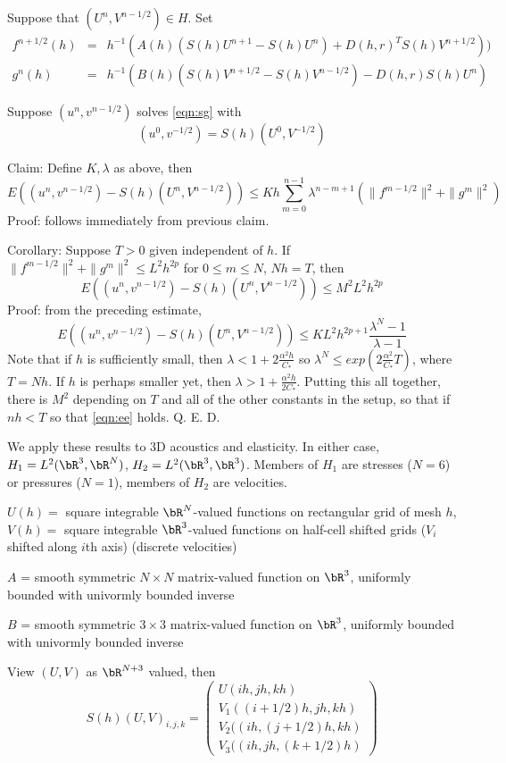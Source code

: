 Suppose that $(U^n,V^{n-1/2}) \in H$. Set
\begin{eqnarray}
\label{eqn:tr}
f^{n+1/2}(h)& =& h^{-1}(A(h)(S(h)U^{n+1} - S(h)U^n) + D(h,r)^T S(h)V^{n+1/2}))\\
g^{n}(h)& =& h^{-1}(B(h)(S(h)V^{n+1/2}-S(h)V^{n-1/2}) - D(h,r) S(h)U^n)
\end{eqnarray}

Suppose $(u^n,v^{n-1/2})$ solves \ref{eqn:sg} with 
\[
(u^0, v^{-1/2})=S(h)(U^0,V^{-1/2})
\]

\noindent Claim: Define $K, \lambda$ as above, then
\[
E((u^n,v^{n-1/2})-S(h)(U^n,V^{n-1/2})) \le
Kh\sum_{m=0}^{n-1}\lambda^{n-m+1}(\|f^{m-1/2}\|^2 + \|g^m\|^2)
\]
Proof: follows immediately from previous claim.

\noindent Corollary: Suppose $T>0$ given independent of $h$. If
$\|f^{m-1/2}\|^2 + \|g^m\|^2 \le L^2 h^{2p}$ for $0\le m \le N$, $Nh=T$, then 
\begin{equation}
\label{eqn:ee}
E((u^n,v^{n-1/2})-S(h)(U^n,V^{n-1/2})) \le M^2L^2h^{2p}
\end{equation}
Proof: from the preceding estimate,
\[
E((u^n,v^{n-1/2})-S(h)(U^n,V^{n-1/2})) \le KL^2
h^{2p+1}\frac{\lambda^N-1}{\lambda-1}
\]
Note that if $h$ is sufficiently small, then $\lambda < 1 +
2\frac{\alpha^2h}{C_*}$ so $\lambda^N \le
exp(2\frac{\alpha^2}{C_*}T)$, where $T=Nh$. If $h$ is perhaps smaller
yet, then $\lambda > 1+\frac{\alpha^2h}{2C_*}$. Putting this all
together, there is $M^2$ depending on $T$ and all of the other constants
in the setup, so that if $nh <T$ so that \ref{eqn:ee} holds.
Q. E. D.

We apply these results to 3D acoustics and elasticity. In either case,
$H_1 = L^2(\bR^3,\bR^N)$,  $H_2 = L^2(\bR^3,\bR^3)$. Members of $H_1$
are stresses ($N=6$) or pressures ($N=1$), members of $H_2$ are velocities.

$U(h) = $ square integrable $\bR^N$-valued functions on rectangular
grid of mesh $h$, $V(h) = $ square integrable $\bR^3$-valued functions
on half-cell shifted grids ($V_i$ shifted along $i$th axis) (discrete velocities) 

$A$ = smooth symmetric $N \times N$ matrix-valued function on $\bR^3$,
uniformly bounded with univormly bounded inverse

$B$ = smooth symmetric $3 \times 3$ matrix-valued function on $\bR^3$,
uniformly bounded with univormly bounded inverse
 
View $(U,V)$ as $\bR^{N+3}$ valued, then 
\[
S(h)(U,V)_{i,j,k} = \left(
\begin{array}{c}
U(ih,jh,kh)\\
V_1((i+1/2)h,jh,kh)\\
V_2((ih,(j+1/2)h,kh)\\
V_3((ih,jh,(k+1/2)h)
\end{array}\right)
\]


